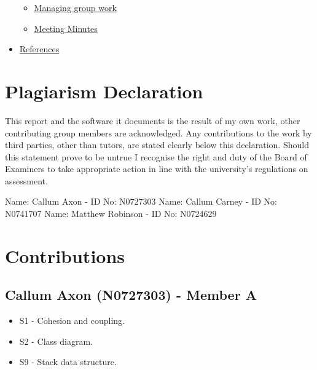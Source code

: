 \documentclass[
  english,
  a4paper,
,tablecaptionabove
]{scrartcl}
\providecommand{\tightlist}{%
  \setlength{\itemsep}{0pt}\setlength{\parskip}{0pt}}
\begin{document}
\begin{itemize}
  \begin{itemize}
  \tightlist
  \item
    \protect\hyperlink{managing-group-work}{Managing group work}
  \item
    \protect\hyperlink{meeting-minutes}{Meeting Minutes}
  \end{itemize}
\item
  \protect\hyperlink{references}{References}
\end{itemize}

\newpage

\hypertarget{plagiarism-declaration}{%
\section{Plagiarism Declaration}\label{plagiarism-declaration}}

This report and the software it documents is the result of my own work,
other contributing group members are acknowledged. Any contributions to
the work by third parties, other than tutors, are stated clearly below
this declaration. Should this statement prove to be untrue I recognise
the right and duty of the Board of Examiners to take appropriate action
in line with the university's regulations on assessment.

Name: Callum Axon - ID No: N0727303 \newline Name: Callum Carney - ID
No: N0741707 \newline Name: Matthew Robinson - ID No: N0724629

\newpage

\hypertarget{contributions}{%
\section{Contributions}\label{contributions}}

\hypertarget{callum-axon-n0727303---member-a}{%
\subsection{Callum Axon (N0727303) - Member
A}\label{callum-axon-n0727303---member-a}}

\begin{itemize}
\tightlist
\item
  S1 - Cohesion and coupling.
\item
  S2 - Class diagram.
\item
  S9 - Stack data structure.
\end{itemize}
\end{document}
